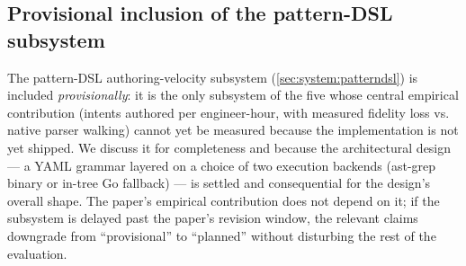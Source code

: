\subsection{Provisional inclusion of the pattern-DSL subsystem}
\label{sec:discussion:patterndsl}

The pattern-DSL authoring-velocity subsystem
(\cref{sec:system:patterndsl}) is included \emph{provisionally}: it
is the only subsystem of the five whose central empirical contribution
(intents authored per engineer-hour, with measured fidelity loss vs.
native parser walking) cannot yet be measured because the
implementation is not yet shipped. We discuss it for completeness
and because the architectural design --- a YAML grammar layered on a
choice of two execution backends (ast-grep binary or in-tree Go
fallback) --- is settled and consequential for the design's overall
shape. The paper's empirical contribution does not depend on it; if
the subsystem is delayed past the paper's revision window, the
relevant claims downgrade from ``provisional'' to ``planned'' without
disturbing the rest of the evaluation.
